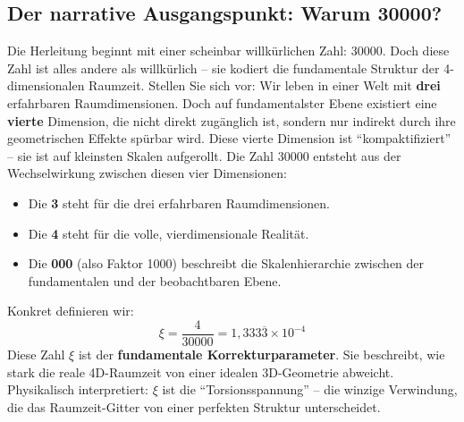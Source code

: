 	\subsection{Der narrative Ausgangspunkt: Warum 30000?}
	Die Herleitung beginnt mit einer scheinbar willkürlichen Zahl: \(30000\). Doch diese Zahl ist alles andere als willkürlich -- sie kodiert die fundamentale Struktur der 4-dimensionalen Raumzeit.
	Stellen Sie sich vor: Wir leben in einer Welt mit \textbf{drei} erfahrbaren Raumdimensionen. Doch auf fundamentalster Ebene existiert eine \textbf{vierte} Dimension, die nicht direkt zugänglich ist, sondern nur indirekt durch ihre geometrischen Effekte spürbar wird. Diese vierte Dimension ist \enquote{kompaktifiziert} -- sie ist auf kleinsten Skalen aufgerollt.
	Die Zahl \(30000\) entsteht aus der Wechselwirkung zwischen diesen vier Dimensionen:
	\begin{itemize}
		\item Die \textbf{3} steht für die drei erfahrbaren Raumdimensionen.
		\item Die \textbf{4} steht für die volle, vierdimensionale Realität.
		\item Die \textbf{000} (also Faktor 1000) beschreibt die Skalenhierarchie zwischen der fundamentalen und der beobachtbaren Ebene.
	\end{itemize}
	Konkret definieren wir:
	\begin{equation}
		\boxed{\xi = \frac{4}{30000} = 1{,}333\overline{3} \times 10^{-4}}
	\end{equation}
	Diese Zahl \(\xi\) ist der \textbf{fundamentale Korrekturparameter}. Sie beschreibt, wie stark die reale 4D-Raumzeit von einer idealen 3D-Geometrie abweicht. Physikalisch interpretiert: \(\xi\) ist die \enquote{Torsionsspannung} -- die winzige Verwindung, die das Raumzeit-Gitter von einer perfekten Struktur unterscheidet.
